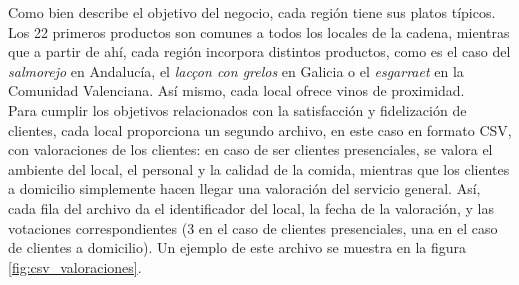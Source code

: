 \documentclass[12pt]{opticajnl}
\begin{document}
Como bien describe el objetivo del negocio, cada región tiene sus platos típicos. Los 22 primeros productos son comunes a todos los locales de la cadena, mientras que a partir de ahí, cada región incorpora distintos productos, como es el caso del \textit{salmorejo} en Andalucía, el \textit{lacçon con grelos} en Galicia o el \textit{esgarraet} en la Comunidad Valenciana. Así mismo, cada local ofrece vinos de proximidad. \\

Para cumplir los objetivos relacionados con la satisfacción y fidelización de clientes, cada local proporciona un segundo archivo, en este caso en formato CSV, con valoraciones de los clientes: en caso de ser clientes presenciales, se valora el ambiente del local, el personal y la calidad de la comida, mientras que los clientes a domicilio simplemente hacen llegar una valoración del servicio general. Así, cada fila del archivo da el identificador del local, la fecha de la valoración, y las votaciones correspondientes (3 en el caso de clientes presenciales, una en el caso de clientes a domicilio). Un ejemplo de este archivo se muestra en la figura \ref{fig:csv_valoraciones}.
\end{document}
